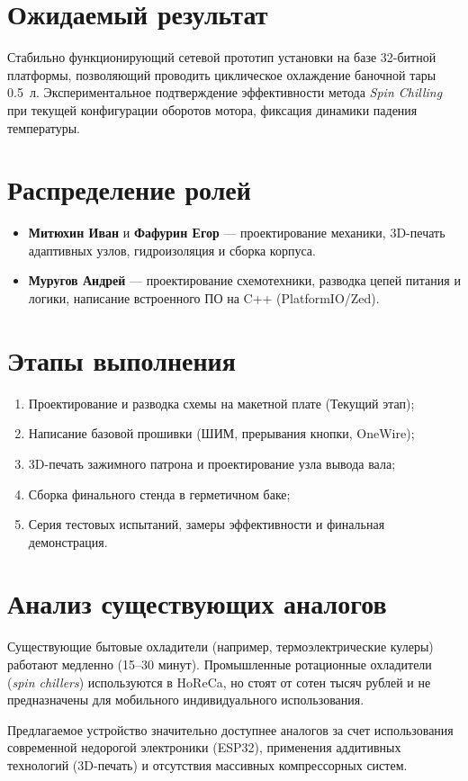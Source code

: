 \documentclass[a4paper,12pt]{article}
\begin{document}
\section{Ожидаемый результат}
Стабильно функционирующий сетевой прототип установки на базе 32-битной платформы, позволяющий проводить циклическое охлаждение баночной тары 0.5~л. Экспериментальное подтверждение эффективности метода \textit{Spin Chilling} при текущей конфигурации оборотов мотора, фиксация динамики падения температуры.

\section{Распределение ролей}
\begin{itemize}
    \item \textbf{Митюхин Иван} и \textbf{Фафурин Егор} --- проектирование механики, 3D-печать адаптивных узлов, гидроизоляция и сборка корпуса.
    \item \textbf{Муругов Андрей} --- проектирование схемотехники, разводка цепей питания и логики, написание встроенного ПО на C++ (PlatformIO/Zed).
\end{itemize}

\section{Этапы выполнения}
\begin{enumerate}
    \item Проектирование и разводка схемы на макетной плате (Текущий этап);
    \item Написание базовой прошивки (ШИМ, прерывания кнопки, OneWire);
    \item 3D-печать зажимного патрона и проектирование узла вывода вала;
    \item Сборка финального стенда в герметичном баке;
    \item Серия тестовых испытаний, замеры эффективности и финальная демонстрация.
\end{enumerate}

\section{Анализ существующих аналогов}
Существующие бытовые охладители (например, термоэлектрические кулеры) работают медленно (15–30 минут). Промышленные ротационные охладители (\textit{spin chillers}) используются в HoReCa, но стоят от сотен тысяч рублей и не предназначены для мобильного индивидуального использования. 

Предлагаемое устройство значительно доступнее аналогов за счет использования современной недорогой электроники (ESP32), применения аддитивных технологий (3D-печать) и отсутствия массивных компрессорных систем.
\end{document}
